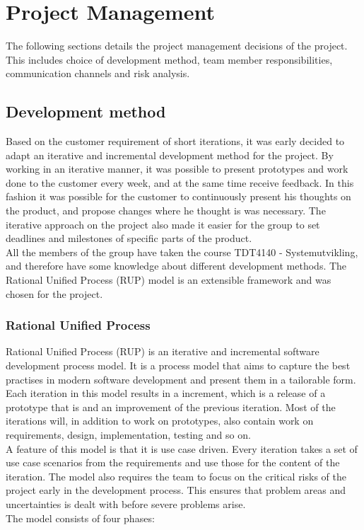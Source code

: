 \chapter{Project Management}
The following sections details the project management decisions of the project. This includes choice of development method, team member responsibilities, communication channels and risk analysis.

\section{Development method}
Based on the customer requirement of short iterations, it was early decided to adapt an iterative and incremental development method for the project. By working in an iterative manner, it was possible to present prototypes and work done to the customer every week, and at the same time receive feedback. In this fashion it was possible for the customer to continuously present his thoughts on the product, and propose changes where he thought is was necessary. The iterative approach on the project also made it easier for the group to set deadlines and milestones of specific parts of the product.\\
\newline
All the members of the group have taken the course TDT4140 - Systemutvikling, and therefore have some knowledge about different development methods. The Rational Unified Process (RUP) model is an extensible framework\cite{kruchten} and was chosen for the project.

\subsection{Rational Unified Process}
Rational Unified Process (RUP) is an iterative and incremental software development process model. It is a process model that aims to capture the best practises in modern software development and present them in a tailorable form.\cite{kruchten} Each iteration in this model results in a increment, which is a release of a prototype that is and an improvement of the previous iteration. Most of the iterations will, in addition to work on prototypes, also contain work on requirements, design, implementation, testing and so on.\\
\newline
A feature of this model is that it is use case driven. Every iteration takes a set of use case scenarios from the requirements and use those for the content of the iteration. The model also requires the team to focus on the critical risks of the project early in the development process. This ensures that problem areas and uncertainties is dealt with before severe problems arise.\\
\newline
The model consists of four phases:

